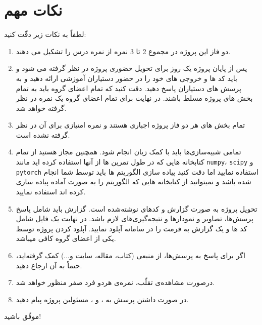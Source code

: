 \documentclass[a4paper]{article}
\begin{document}
\section{نکات مهم}
\label{sec:important_points}
لطفاً به نکات زیر دقّت کنید:
\begin{enumerate}
\item
دو فاز این پروژه در مجموع 2 تا 3 نمره از نمره درس را تشکیل می دهند.
\item
پس از پایان پروژه یک روز برای تحویل حضوری پروژه در نظر گرفته می شود و باید کد ها و خروجی های خود را در حضور دستیاران آموزشی ارائه دهید و به پرسش های دستیاران پاسخ دهید. دقت کنید که تمام اعضای گروه باید به تمام بخش های پروژه مسلط باشند. در نهایت برای تمام اعضای گروه یک نمره در نظر گرفته خواهد شد.
	\item 
	تمام بخش های هر دو فاز پروژه اجباری هستند و نمره امتیازی برای آن در نظر گرفته نشده است.
	\item 
	تمامی شبیه‌سازی‌ها باید با کمک زبان
انجام شود. همچنین مجاز هستید از تمام کتابخانه هایی که در طول تمرین ها از آنها استفاده کرده اید مانند
\texttt{numpy}،
\texttt{scipy}
و
\texttt{pytorch}
استفاده نمایید اما دقت کنید پیاده سازی الگوریتم ها باید توسط شما انجام شده باشد و نمیتوانید از کتابخانه هایی که الگوریتم را به صورت آماده پیاده سازی کرده اند استفاده نمایید.
	\item
	تحویل پروژه به صورت گزارش و کدهای نوشته‌شده است. گزارش باید شامل پاسخ پرسش‌ها، تصاویر و نمودارها و نتیجه‌گیری‌های لازم باشد. در نهایت یک فایل شامل کد ها و یک گزارش به فرمت
را در سامانه 
آپلود نمایید. آپلود کردن پروژه توسط یکی از اعضای گروه کافی میباشد.
	\item
	اگر برای پاسخ به پرسش‌ها، از منبعی (کتاب، مقاله، سایت و...) کمک گرفته‌اید، حتماً به آن ارجاع دهید.
	
	\item 
	درصورت مشاهده‌ی تقلّب، نمره‌ی هردو فرد صفر منظور خواهد شد.

\item
در صورت داشتن پرسش به
،
و
، مسئولین پروژه
پیام دهید.
\end{enumerate}
\begin{flushleft}
	موفّق باشید!
\end{flushleft}


\newpage


\end{document}
